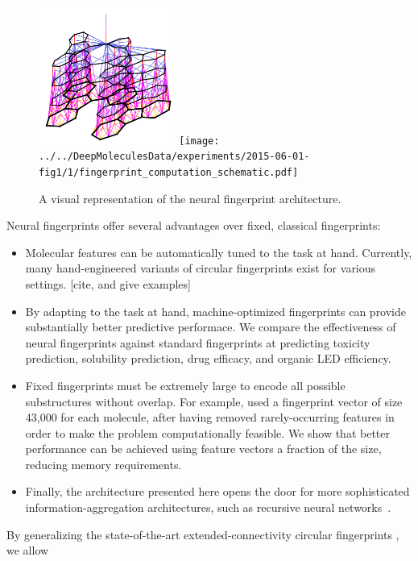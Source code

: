 \documentclass{article}
\begin{document}
\begin{figure}
\centerline{\includegraphics[width=0.4\textwidth]{figures/3d-nets/net1}
\texttt{[image: ../../DeepMoleculesData/experiments/2015-06-01-fig1/1/fingerprint\_computation\_schematic.pdf]}
}
\caption{A visual representation of the neural fingerprint architecture.}
\label{fig:architecture sketch}
\end{figure}

Neural fingerprints offer several advantages over fixed, classical fingerprints:
\begin{itemize}
\item Molecular features can be automatically tuned to the task at hand.
Currently, many hand-engineered variants of circular fingerprints exist for various settings. [cite, and give examples]
\item By adapting to the task at hand, machine-optimized fingerprints can provide substantially better predictive performace.
We compare the effectiveness of neural fingerprints against standard fingerprints at predicting toxicity prediction, solubility prediction, drug efficacy, and organic LED efficiency.
\item Fixed fingerprints must be extremely large to encode all possible substructures without overlap.
For example, \cite{unterthinerdeep} used a fingerprint vector of size 43,000 for each molecule, after having removed rarely-occurring features in order to make the problem computationally feasible.
We show that better performance can be achieved using feature vectors a fraction of the size, reducing memory requirements.
\item Finally, the architecture presented here opens the door for more sophisticated information-aggregation architectures, such as recursive neural networks~\citep{socher2011semi, socher2011dynamic}.
\end{itemize}

By generalizing the state-of-the-art extended-connectivity circular fingerprints , we allow
\end{document}
